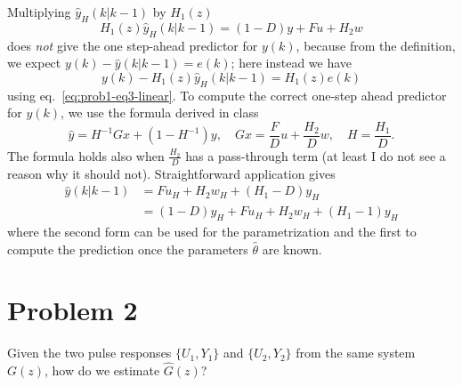 \documentclass[11pt]{article}
\begin{document}
\begin{enumerate}
Multiplying $\hat{y}_H(k|k-1)$ by $H_1(z)$
\begin{equation*}
  H_1(z)\hat{y}_H(k|k-1) = (1-D)y + Fu + H_2w
\end{equation*}
does \emph{not} give the one step-ahead predictor for $y(k)$, because from the definition, we expect $y(k)-\hat{y}(k|k-1)=e(k)$; here instead we have
\begin{equation*}
  y(k)-H_1(z)\hat{y}_H(k|k-1) = H_1(z)e(k)
\end{equation*}
using eq.~\eqref{eq:prob1-eq3-linear}. To compute the correct one-step ahead predictor for $y(k)$, we use the formula derived in class
\begin{equation*}
  \hat{y} = H^{-1}Gx + (1-H^{-1})y, \hspace{1em} Gx = \frac{F}{D}u+\frac{H_2}{D}w, \hspace{1em} H = \frac{H_1}{D}.
\end{equation*}
The formula holds also when $\frac{H_2}{D}$ has a pass-through term (at least I do not see a reason why it should not). Straightforward application gives
\begin{align*}
  \hat{y}(k|k-1) &= Fu_H + H_2w_H + (H_1-D)y_H \\
                 &= (1-D)y_H + Fu_H + H_2w_H + (H_1-1)y_H
\end{align*}
where the second form can be used for the parametrization and the first to compute the prediction once the parameters $\hat{\theta}$ are known.
\end{enumerate}


\section*{Problem 2}
\label{sec:prob2}

Given the two pulse responses $\{U_1,Y_1\}$ and $\{U_2,Y_2\}$ from the same system $G(z)$, how do we estimate $\hat{G}(z)$?
\end{document}
